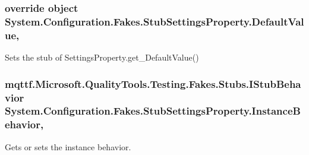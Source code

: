 \hypertarget{class_system_1_1_configuration_1_1_fakes_1_1_stub_settings_property_a388540d1a766cb0ae903565134031373}{
\subsubsection[{Default\-Value}]{\setlength{\rightskip}{0pt plus 5cm}override object System.\-Configuration.\-Fakes.\-Stub\-Settings\-Property.\-Default\-Value\hspace{0.3cm}{\ttfamily [get]}, {\ttfamily [set]}}}\label{class_system_1_1_configuration_1_1_fakes_1_1_stub_settings_property_a388540d1a766cb0ae903565134031373}


Sets the stub of Settings\-Property.\-get\-\_\-\-Default\-Value()

\hypertarget{class_system_1_1_configuration_1_1_fakes_1_1_stub_settings_property_ac774dd987621a61b559ce8be01d2b9fe}{
\subsubsection[{Instance\-Behavior}]{\setlength{\rightskip}{0pt plus 5cm}mqttf.\-Microsoft.\-Quality\-Tools.\-Testing.\-Fakes.\-Stubs.\-I\-Stub\-Behavior System.\-Configuration.\-Fakes.\-Stub\-Settings\-Property.\-Instance\-Behavior\hspace{0.3cm}{\ttfamily [get]}, {\ttfamily [set]}}}\label{class_system_1_1_configuration_1_1_fakes_1_1_stub_settings_property_ac774dd987621a61b559ce8be01d2b9fe}


Gets or sets the instance behavior.

